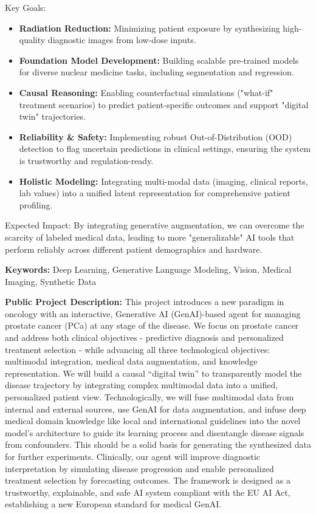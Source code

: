 \documentclass[12pt,a4paper]{article}
\begin{document}
Key Goals:
\begin{itemize}
    \item \textbf{Radiation Reduction:} Minimizing patient exposure by synthesizing high-quality diagnostic images from low-dose inputs.
    \item \textbf{Foundation Model Development:} Building scalable pre-trained models for diverse nuclear medicine tasks, including segmentation and regression.
    \item \textbf{Causal Reasoning:} Enabling counterfactual simulations ("what-if" treatment scenarios) to predict patient-specific outcomes and support "digital twin" trajectories.
    \item \textbf{Reliability \& Safety:} Implementing robust Out-of-Distribution (OOD) detection to flag uncertain predictions in clinical settings, ensuring the system is trustworthy and regulation-ready.
    \item \textbf{Holistic Modeling:} Integrating multi-modal data (imaging, clinical reports, lab values) into a unified latent representation for comprehensive patient profiling.
\end{itemize}

Expected Impact: By integrating generative augmentation, we can overcome the scarcity of labeled medical data, leading to more "generalizable" AI tools that perform reliably across different patient demographics and hardware.

\textbf{Keywords:} Deep Learning, Generative Language Modeling, Vision, Medical Imaging, Synthetic Data


\textbf{Public Project Description:} This project introduces a new paradigm in oncology with an interactive, Generative AI (GenAI)-based agent for managing prostate cancer (PCa) at any stage of the disease. We focus on prostate cancer and address both clinical objectives - predictive diagnosis and personalized treatment selection - while advancing all three technological objectives: multimodal integration, medical data augmentation, and knowledge representation. We will build a causal ``digital twin'' to transparently model the disease trajectory by integrating complex multimodal data into a unified, personalized patient view. Technologically, we will fuse multimodal data from internal and external sources, use GenAI for data augmentation, and infuse deep medical domain knowledge like local and international guidelines into the novel model's architecture to guide its learning process and disentangle disease signals from confounders. This should be a solid basis for generating the synthesized data for further experiments. Clinically, our agent will improve diagnostic interpretation by simulating disease progression and enable personalized treatment selection by forecasting outcomes. The framework is designed as a trustworthy, explainable, and safe AI system compliant with the EU AI Act, establishing a new European standard for medical GenAI.
\end{document}
